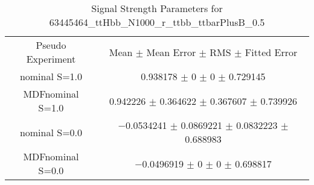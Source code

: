 \begin{table}
\centering
\caption{Signal Strength Parameters for 63445464\_ttHbb\_N1000\_r\_ttbb\_ttbarPlusB\_0.5}
\begin{tabular}{cc}
\toprule
Pseudo Experiment & Mean $\pm$ Mean Error $\pm$ RMS $\pm$ Fitted Error\\
nominal S=1.0 & \num{0.938178} $\pm$ \num{0} $\pm$ \num{0} $\pm$ \num{0.729145}\\
MDFnominal S=1.0 & \num{0.942226} $\pm$ \num{0.364622} $\pm$ \num{0.367607} $\pm$ \num{0.739926}\\
nominal S=0.0 & \num{-0.0534241} $\pm$ \num{0.0869221} $\pm$ \num{0.0832223} $\pm$ \num{0.688983}\\
MDFnominal S=0.0 & \num{-0.0496919} $\pm$ \num{0} $\pm$ \num{0} $\pm$ \num{0.698817}\\
\bottomrule
\end{tabular}
\end{table}